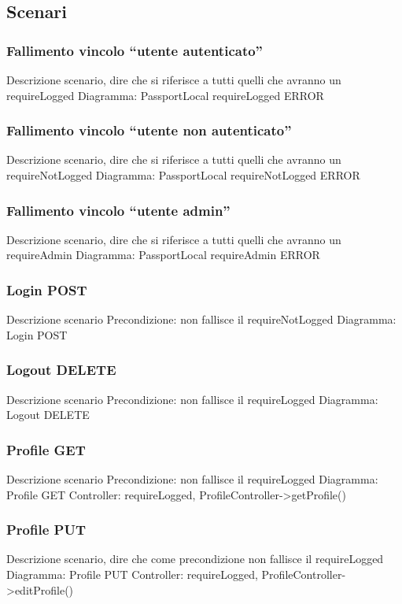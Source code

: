 \subsection{Scenari}

\subsubsection{Fallimento vincolo ``utente autenticato''}
Descrizione scenario, dire che si riferisce a tutti quelli che avranno un requireLogged
Diagramma: PassportLocal requireLogged ERROR

\subsubsection{Fallimento vincolo ``utente non autenticato''}
Descrizione scenario, dire che si riferisce a tutti quelli che avranno un requireNotLogged
Diagramma: PassportLocal requireNotLogged ERROR

\subsubsection{Fallimento vincolo ``utente admin''}
Descrizione scenario, dire che si riferisce a tutti quelli che avranno un requireAdmin
Diagramma: PassportLocal requireAdmin ERROR

\subsubsection{Login POST}
Descrizione scenario
Precondizione: non fallisce il requireNotLogged
Diagramma: Login POST

\subsubsection{Logout DELETE}
Descrizione scenario
Precondizione: non fallisce il requireLogged
Diagramma: Logout DELETE

\subsubsection{Profile GET}
Descrizione scenario
Precondizione: non fallisce il requireLogged
Diagramma: Profile GET
Controller: requireLogged, ProfileController->getProfile()

\subsubsection{Profile PUT}
Descrizione scenario, dire che come precondizione non fallisce il requireLogged
Diagramma: Profile PUT
Controller: requireLogged, ProfileController->editProfile()

